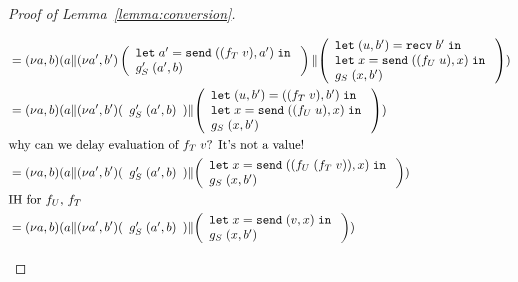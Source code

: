 \begin{proof}[Proof of Lemma~\ref{lemma:conversion}]
\begin{enumerate}
\begin{itemize}
\begin{align*}
        &= \PScope ({\PPar {a} {\PScope[a',b'] \PPar {\left(
          \begin{array}{l}
        \ELet {a'} {\ESend {(f_T \; v)} {a'}} \\
          g'_S \; (a', b)
          \end{array}
        \right)} {{ \left(
        \begin{array}{l}
          \ELetP {u} {b'} {\ERecv{b'}} \\
        \ELet {x} {\ESend {(f_U \; u)} {x}}  \\
        g_S \; (x, b')
        \end{array}
        \right) }}}})  \\
        &= \PScope ({\PPar {a} {\PScope[a',b'] \PPar {(
          \begin{array}[t]{l}
          g'_S \; (a', b)
          \end{array}
        )} {{ \left(
        \begin{array}{l}
          \ELetP {u} {b'} {((f_T \; v), b')} \\
        \ELet {x} {\ESend {(f_U \; u)} {x}}  \\
        g_S \; (x, b')
        \end{array}
        \right) }}}})  \\
        & \text{why can we delay evaluation of $f_T\;v$? It's not a value!} \\
        &= \PScope ({\PPar {a} {\PScope[a',b'] \PPar {(
          \begin{array}[t]{l}
          g'_S \; (a', b)
          \end{array}
        )} {{ \left(
        \begin{array}{l}
        \ELet {x} {\ESend {(f_U \; (f_T \; v))} {x}}  \\
        g_S \; (x, b')
        \end{array}
        \right) }}}})  \\
        & \text{IH for $f_U$, $f_T$} \\
        &= \PScope ({\PPar {a} {\PScope[a',b'] \PPar {(
          \begin{array}[t]{l}
          g'_S \; (a', b)
          \end{array}
        )} {{ \left(
        \begin{array}{l}
        \ELet {x} {\ESend {v} {x}}  \\
        g_S \; (x, b')
        \end{array}
        \right) }}}})  \\

\end{align*}
\end{itemize}
\end{enumerate}
\end{proof}
